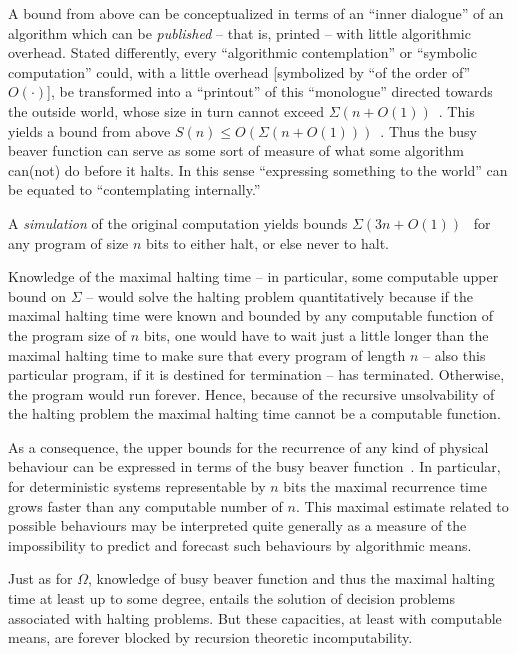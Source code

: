 A bound from above can be conceptualized in terms of an ``inner dialogue'' of an algorithm  which can be
{\em published} -- that is, printed -- with little
algorithmic overhead.
Stated differently, every ``algorithmic contemplation'' or ``symbolic computation'' could,
with a little overhead [symbolized by ``of the order of'' $O(\cdot )$],
be transformed into a ``printout'' of this ``monologue'' directed towards the outside world,
whose size in turn cannot exceed  $\Sigma (n+O(1))$~\cite{chaitin-ACM}.
This yields a bound from above $S(n )\le O\left(\Sigma (n+O(1))\right)$~\cite{calude:pr}.
Thus the busy beaver function can serve as some sort of measure of what some algorithm  can(not) do before it halts.
In this sense ``expressing something to the world'' can be equated to ``contemplating internally.''


A {\em simulation} of the original computation yields bounds
$\Sigma (3n+O(1))$~\cite{Ben-Amram1996,Ben-Amram2002} for
any program of size $n$ bits to either halt,  or else never to halt.



Knowledge of the maximal halting time -- in particular, some computable upper bound on $\Sigma$ -- would solve the halting
problem quantitatively
because if the maximal halting time were known
and bounded by any computable function of the program size of $n$ bits,
one would have to wait
just a little longer than the maximal halting time to make sure
that every program of length $n$  --  also this particular program, if it is destined for termination  --
has terminated.
Otherwise, the program would run forever.
Hence, because of the recursive unsolvability of the halting problem
the maximal halting time cannot be a computable function.



As a consequence, the upper bounds for the recurrence of any kind of physical behaviour can be expressed
in terms of the busy beaver function~\cite{svozil-93}.
In particular,
for deterministic systems representable by $n$ bits
the maximal recurrence time grows faster than any computable number
of $n$.
This maximal estimate related to possible behaviours may be interpreted quite generally
as a measure
of the impossibility to predict and forecast such behaviours by algorithmic means.

Just as for  $\Omega$,   knowledge of busy beaver function and thus the maximal halting time
at least up to some degree, entails the solution of decision problems associated with halting problems.
But these capacities, at least with computable means, are forever blocked by recursion theoretic incomputability.


